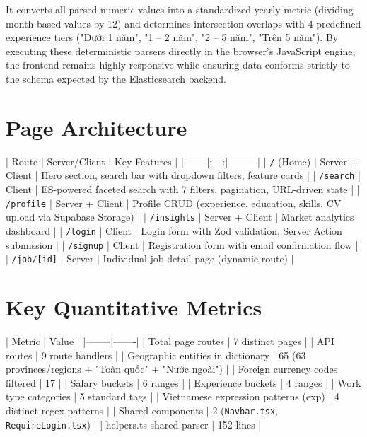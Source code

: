 It converts all parsed numeric values into a standardized yearly metric (dividing month-based values by 12) and determines intersection overlaps with 4 predefined experience tiers ("Dưới 1 năm", "1 – 2 năm", "2 – 5 năm", "Trên 5 năm"). By executing these deterministic parsers directly in the browser's JavaScript engine, the frontend remains highly responsive while ensuring data conforms strictly to the schema expected by the Elasticsearch backend.

\section{Page Architecture}

| Route | Server/Client | Key Features |
|-------|:---:|---------|
| \texttt{/} (Home) | Server + Client | Hero section, search bar with dropdown filters, feature cards |
| \texttt{/search} | Client | ES-powered faceted search with 7 filters, pagination, URL-driven state |
| \texttt{/profile} | Server + Client | Profile CRUD (experience, education, skills, CV upload via Supabase Storage) |
| \texttt{/insights} | Server + Client | Market analytics dashboard |
| \texttt{/login} | Client | Login form with Zod validation, Server Action submission |
| \texttt{/signup} | Client | Registration form with email confirmation flow |
| \texttt{/job/[id]} | Server | Individual job detail page (dynamic route) |

\section{Key Quantitative Metrics}

| Metric | Value |
|--------|-------|
| Total page routes | 7 distinct pages |
| API routes | 9 route handlers |
| Geographic entities in dictionary | 65 (63 provinces/regions + "Toàn quốc" + "Nước ngoài") |
| Foreign currency codes filtered | 17 |
| Salary buckets | 6 ranges |
| Experience buckets | 4 ranges |
| Work type categories | 5 standard tags |
| Vietnamese expression patterns (exp) | 4 distinct regex patterns |
| Shared components | 2 (\texttt{Navbar.tsx}, \texttt{RequireLogin.tsx}) |
| helpers.ts shared parser | 152 lines |
